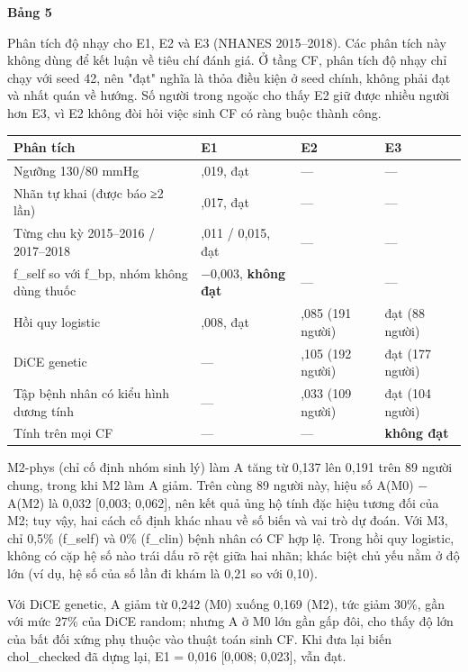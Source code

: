 \documentclass[9pt,a4paper]{extarticle}
\newcommand{\tabcap}[2]{{\footnotesize\textbf{Bảng #1}\par\vspace{1pt}#2\par}\vspace{3pt}\scriptsize}
\begin{document}
\begin{table}[!t]
\tabcap{5}{Phân tích độ nhạy cho E1, E2 và E3 (NHANES 2015–2018). Các phân tích này không dùng để kết luận về tiêu chí đánh giá. Ở tầng CF, phân tích độ nhạy chỉ chạy với seed 42, nên "đạt" nghĩa là thỏa điều kiện ở seed chính, không phải đạt và nhất quán về hướng. Số người trong ngoặc cho thấy E2 giữ được nhiều người hơn E3, vì E2 không đòi hỏi việc sinh CF có ràng buộc thành công.}
\begin{tabularx}{\columnwidth}{>{\raggedright\arraybackslash}X>{\raggedright\arraybackslash}X>{\raggedright\arraybackslash}X>{\raggedright\arraybackslash}X}
\toprule
\textbf{Phân tích} & \textbf{E1} & \textbf{E2} & \textbf{E3} \\ \midrule
Ngưỡng 130/80 mmHg & 0,019, đạt & — & — \\
Nhãn tự khai (được báo ≥2 lần) & 0,017, đạt & — & — \\
Từng chu kỳ 2015–2016 / 2017–2018 & 0,011 / 0,015, đạt & — & — \\
f\_self so với f\_bp, nhóm không dùng thuốc & −0,003, \textbf{không đạt} & — & — \\
Hồi quy logistic & 0,008, đạt & 0,085 (191 người) & đạt (88 người) \\
DiCE genetic & — & 0,105 (192 người) & đạt (177 người) \\
Tập bệnh nhân có kiểu hình dương tính & — & 0,033 (109 người) & đạt (104 người) \\
Tính trên mọi CF & — & — & \textbf{không đạt} \\
\bottomrule
\end{tabularx}
\end{table}

M2-phys (chỉ cố định nhóm sinh lý) làm A tăng từ 0,137 lên 0,191 trên 89
người chung, trong khi M2 làm A giảm. Trên cùng 89 người này, hiệu số
A(M0) − A(M2) là 0,032 {[}0,003; 0,062{]}, nên kết quả ủng hộ tính đặc
hiệu tương đối của M2; tuy vậy, hai cách cố định khác nhau về số biến và
vai trò dự đoán. Với M3, chỉ 0,5\% (f\_self) và 0\% (f\_clin) bệnh nhân
có CF hợp lệ. Trong hồi quy logistic, không có cặp hệ số nào trái dấu rõ
rệt giữa hai nhãn; khác biệt chủ yếu nằm ở độ lớn (ví dụ, hệ số của số
lần đi khám là 0,21 so với 0,10).

Với DiCE genetic, A giảm từ 0,242 (M0) xuống 0,169 (M2), tức giảm 30\%,
gần với mức 27\% của DiCE random; nhưng A ở M0 lớn gần gấp đôi, cho thấy
độ lớn của bất đối xứng phụ thuộc vào thuật toán sinh CF. Khi đưa lại
biến chol\_checked đã dựng lại, E1 = 0,016 {[}0,008; 0,023{]}, vẫn đạt.
\end{document}
